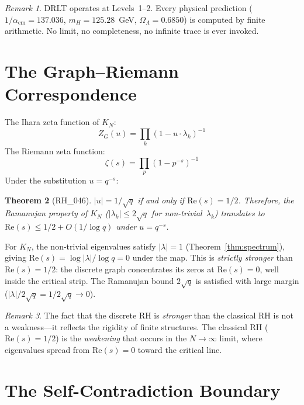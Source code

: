 \documentclass[12pt]{article}
\newtheorem{theorem}{Theorem}[section]
\theoremstyle{definition}
\theoremstyle{remark}
\newtheorem{remark}[theorem]{Remark}
\begin{document}
\begin{remark}
DRLT operates at Levels~1--2. Every physical prediction
($1/\alpha_{\mathrm{em}} = 137.036$, $m_H = 125.28$~GeV,
$\Omega_\Lambda = 0.6850$)
is computed by finite arithmetic. No limit, no completeness,
no infinite trace is ever invoked.
\end{remark}

\section{The Graph--Riemann Correspondence}
\label{sec:correspondence}

The Ihara zeta function of $K_N$:
\[
  Z_G(u) = \prod_k (1 - u \cdot \lambda_k)^{-1}
\]
The Riemann zeta function:
\[
  \zeta(s) = \prod_p (1 - p^{-s})^{-1}
\]
Under the substitution $u = q^{-s}$:

\begin{theorem}[RH\_046]\label{thm:correspondence}
$|u| = 1/\sqrt{q}$ if and only if $\mathrm{Re}(s) = 1/2$.
Therefore, the Ramanujan property of $K_N$
($|\lambda_k| \leq 2\sqrt{q}$ for non-trivial~$\lambda_k$)
translates to $\mathrm{Re}(s) \leq 1/2 + O(1/\!\log q)$
under $u = q^{-s}$.
\end{theorem}

For $K_N$, the non-trivial eigenvalues satisfy $|\lambda| = 1$
(Theorem~\ref{thm:spectrum}), giving
$\mathrm{Re}(s) = \log|\lambda|/\log q = 0$ under the map.
This is \emph{strictly stronger} than $\mathrm{Re}(s) = 1/2$:
the discrete graph concentrates its zeros at $\mathrm{Re}(s) = 0$,
well inside the critical strip.
The Ramanujan bound $2\sqrt{q}$ is satisfied with large margin
($|\lambda|/2\sqrt{q} = 1/2\sqrt{q} \to 0$).

\begin{remark}
The fact that the discrete RH is \emph{stronger} than the
classical RH is not a weakness---it reflects the rigidity of
finite structures.
The classical RH ($\mathrm{Re}(s) = 1/2$) is the
\emph{weakening} that occurs in the $N \to \infty$ limit,
where eigenvalues spread from $\mathrm{Re}(s) = 0$ toward
the critical line.
\end{remark}

\section{The Self-Contradiction Boundary}
\label{sec:wall}
\end{document}
